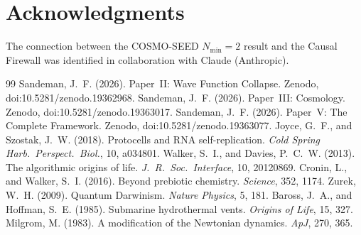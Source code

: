 \documentclass[12pt,a4paper]{article}
\begin{document}
\section*{Acknowledgments}
The connection between the COSMO-SEED $N_{\min}=2$ result and the Causal Firewall was identified in collaboration with Claude (Anthropic).


\begin{thebibliography}{99}
 Sandeman, J.~F. (2026). Paper~II: Wave Function Collapse. Zenodo, doi:10.5281/zenodo.19362968.
 Sandeman, J.~F. (2026). Paper~III: Cosmology. Zenodo, doi:10.5281/zenodo.19363017.
 Sandeman, J.~F. (2026). Paper~V: The Complete Framework. Zenodo, doi:10.5281/zenodo.19363077.
 Joyce, G.~F., and Szostak, J.~W. (2018). Protocells and RNA self-replication. \textit{Cold Spring Harb.\ Perspect.\ Biol.}, 10, a034801.
 Walker, S.~I., and Davies, P.~C.~W. (2013). The algorithmic origins of life. \textit{J.\ R.\ Soc.\ Interface}, 10, 20120869.
 Cronin, L., and Walker, S.~I. (2016). Beyond prebiotic chemistry. \textit{Science}, 352, 1174.
 Zurek, W.~H. (2009). Quantum Darwinism. \textit{Nature Physics}, 5, 181.
 Baross, J.~A., and Hoffman, S.~E. (1985). Submarine hydrothermal vents. \textit{Origins of Life}, 15, 327.
 Milgrom, M. (1983). A modification of the Newtonian dynamics. \textit{ApJ}, 270, 365.
\end{thebibliography}
\end{document}
